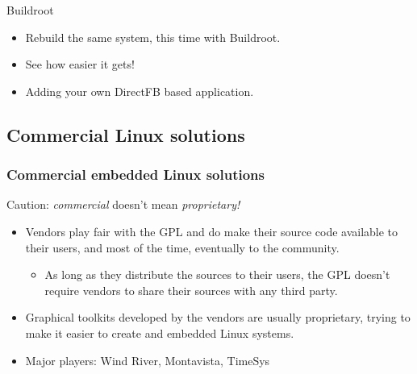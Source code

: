 \setuplabframe
{Buildroot}
{
  \begin{itemize}
  \item Rebuild the same system, this time with Buildroot.
  \item See how easier it gets!
  \item Adding your own DirectFB based application.
  \end{itemize}
}

\subsection{Commercial Linux solutions}

\begin{frame}
  \frametitle{Commercial embedded Linux solutions}
  Caution: {\em commercial} doesn't mean {\em proprietary!}
  \begin{itemize}
  \item Vendors play fair with the GPL and do make their source code
    available to their users, and most of the time, eventually to the
    community.
    \begin{itemize}
    \item As long as they distribute the sources to their users, the
      GPL doesn't require vendors to share their sources with any
      third party.
    \end{itemize}
  \item Graphical toolkits developed by the vendors are usually
    proprietary, trying to make it easier to create and embedded Linux
    systems.
  \item Major players: Wind River, Montavista, TimeSys
  \end{itemize}
\end{frame}

